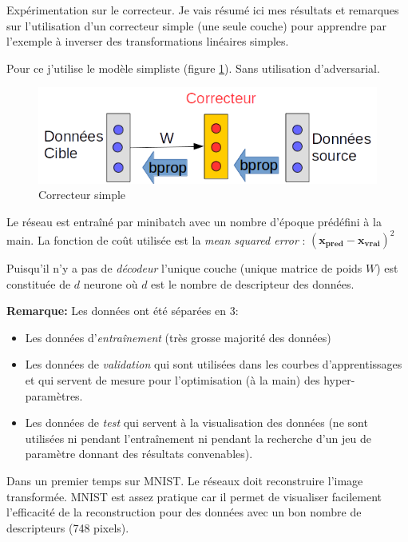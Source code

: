 
\label{day:05-04-2016}

Expérimentation sur le correcteur. Je vais résumé ici mes résultats et remarques
sur l'utilisation d'un correcteur simple (une seule couche) pour apprendre par l'exemple
à inverser des transformations linéaires simples.

Pour ce j'utilise le modèle simpliste (figure \ref{fig:correcteur}). 
Sans utilisation d'adversarial.

\begin{figure}[H]
\centering
\includegraphics[width=0.45\linewidth]{fig/05-04-2016/Correcteur.png}
\caption{Correcteur simple}
\label{fig:correcteur}
\end{figure}

Le réseau est entraîné par minibatch avec un nombre d'époque prédéfini à la main.
La fonction de coût utilisée est la \emph{mean squared error} : $(\pmb{x_{pred}}-\pmb{x_{vrai}})^2$

Puisqu'il n'y a pas de \emph{décodeur} l'unique couche (unique matrice de poids $W$)
est constituée de $d$ neurone où $d$ est le nombre de descripteur des données.

\textbf{Remarque:} Les données ont été séparées en 3:
\begin{itemize}
	\item Les données d'\emph{entraînement} (très grosse majorité des données)
	\item Les données de \emph{validation} qui sont utilisées dans les courbes 
	d'apprentissages et qui servent de mesure pour l'optimisation (à la main) des 
	hyper-paramètres.
	\item Les données de \emph{test} qui servent à la visualisation des données (ne 
	sont utilisées ni pendant l'entraînement ni pendant la recherche d'un jeu de paramètre 
	donnant des résultats convenables).
\end{itemize}



Dans un premier temps sur MNIST.
Le réseaux doit reconstruire l'image transformée.
MNIST est assez pratique car il permet de visualiser facilement l'efficacité 
de la reconstruction pour des données avec un bon nombre de descripteurs (748 pixels).

